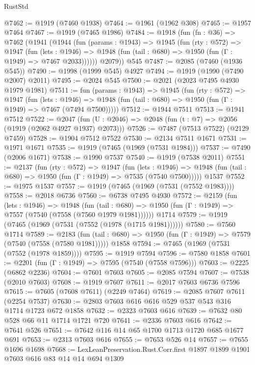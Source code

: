 \begin{lexlean}{RustStd}
\begin{coremodule}
@7462 := @1919 (@7460 @1938)
@7464 := @1961 (@1962 @308)
@7465 := @1957 @7464
@7467 := @1919 (@7465 @1986)
@7484 := @1918
    (fun (fn : @36) =>
    @7462
      (@1941
        (@1944
          (fun (params : @1943) =>
          @1945
            (fun (rty : @572) =>
            @1947
              (fun (lets : @1946) =>
              @1948 (fun (tail : @680) => @1950 (fun (Γ : @1949) => @7467 @2033))))))
        @2079))
    @545
@7487 := @2085 (@7460 (@1936 @545))
@7490 := @1998 (@1999 @545) @4927
@7494 := @1919 (@1990 (@7490 @2007) @2011)
@7495 := @2024 @545
@7500 := @2021 (@2023 @7495 @4930 @1979 @1981)
@7511 := fun (params : @1943) =>
  @1945
    (fun (rty : @572) =>
    @1947
      (fun (lets : @1946) =>
      @1948 (fun (tail : @680) => @1950 (fun (Γ : @1949) => @7467 (@7494 @7500)))))
@7512 := @1944 @7511
@7513 := @1941 @7512
@7522 := @2047 (fun (U : @2046) => @2048 (fun (t : @7) => @2056 (@1919 (@2062 @4927 @1937) @2073)))
@7526 := @7487 (@7513 @7522) (@2129 @7459)
@7528 := @1904 @7512 @7522
@7530 := @2134 @7511 @1671
@7531 := @1971 @1671
@7535 := @1919 (@7465 (@1969 (@7531 @1984)))
@7537 := @7490 (@2006 @1671)
@7538 := @1990 @7537
@7540 := @1919 (@7538 @2011)
@7551 := @2137
    (fun (rty : @572) =>
    @1947
      (fun (lets : @1946) =>
      @1948 (fun (tail : @680) => @1950 (fun (Γ : @1949) => @7535 (@7540 @7500)))))
    @1537
@7552 := @1975 @1537
@7557 := @1919 (@7465 (@1969 (@7531 (@7552 @1983))))
@7558 := @2018 @6736
@7560 := @6738 @7495 @4930
@7572 := @2159
    (fun (lets : @1946) =>
    @1948
      (fun (tail : @680) => @1950 (fun (Γ : @1949) => @7557 (@7540 (@7558 (@7560 @1979 @1981))))))
    @1714
@7579 := @1919 (@7465 (@1969 (@7531 (@7552 (@1978 (@1715 @1981))))))
@7580 := @7560 @1714
@7589 := @2183
    (fun (tail : @680) => @1950 (fun (Γ : @1949) => @7579 (@7540 (@7558 (@7580 @1981)))))
    @1858
@7594 := @7465 (@1969 (@7531 (@7552 (@1978 @1859))))
@7595 := @1919 @7594
@7596 := @7580 @1858
@7601 := @2201 (fun (Γ : @1949) => @7595 (@7540 (@7558 @7596)))
@7603 := @2225 (@6862 @2236)
@7604 := @7601 @7603
@7605 := @2085 @7594
@7607 := @7538 (@2010 @7603)
@7608 := @1919 @7607
@7611 := @2017 @7603 @6736 @7596
@7615 := @7605 (@7608 @7611) (@2249 @7464)
@7619 := @2085 @7607 @7611 (@2254 @7537)
@7630 := @2803 @7603 @616 @616 @529 @537 @543 @316 @1714 @1723 @672 @1858
@7632 := @2323 @7603 @616
@7639 := @7632 @80 @528 @66 @11 @1714 @1721 @720
@7641 := @2336 @7603 @616
@7642 := @7641 @526
@7651 := @7642 @116 @14 @65 @1700 @1713 @1720 @685 @1677 @691
@7653 := @2313 @7603 @616
@7655 := @7653 @526 @14
@7657 := @7655 @1696 @1698
@7668 := LexLeanPreservation.Rust.Corr.first @1897 @1899 @1901 @7603 @616 @83 @14 @14 @694 @1309

\end{coremodule}
\end{lexlean}
